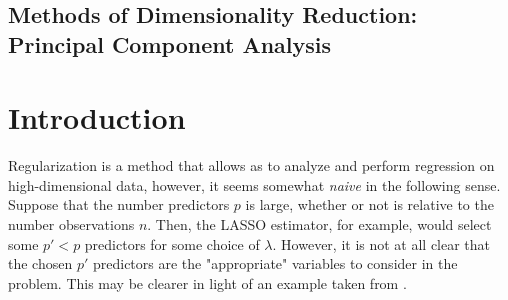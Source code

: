 \documentclass[12pt,letterpaper]{article}
\date{}
\newcommand{\myTitleBox}{
\noindent\makebox[\linewidth][c]{%
    \parbox{\paperwidth}{%
      \hspace*{\dimexpr\hoffset+\oddsidemargin+1in\relax}%
      \begin{minipage}{\dimexpr\textwidth-2\fboxsep-2\fboxrule\relax}
      {\large\textbf{\courseTitleS}\courseTitle\hfill}\vspace{2mm}\\
      {\large\courseInstructors\hfill}\vspace{2mm}\\
      \end{minipage}
  }%
}
}
\begin{document}


\begin{center}
\section*{Methods of Dimensionality Reduction:\\Principal Component Analysis}
\end{center}



\section{Introduction}
\label{sec:intro}

Regularization is a method that allows as to analyze and perform regression on high-dimensional data, however, it seems somewhat \emph{naive} in the following sense. Suppose that the number predictors $p$ is large, whether or not is relative to the number observations $n$. Then, the LASSO estimator, for example, would select some $p' < p$ predictors for some choice of $\lambda$. However, it is not at all clear that the chosen $p'$  predictors are the "appropriate" variables to consider in the problem. This may be clearer in light of an example taken from  \cite{shlens2003}.
\end{document}
